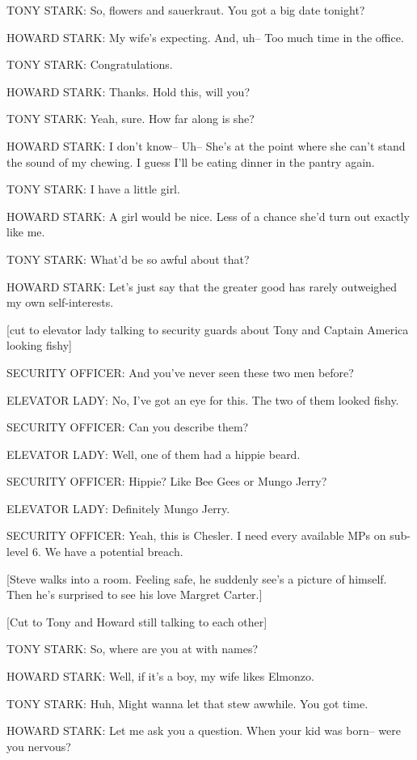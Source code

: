 TONY STARK: So, flowers and sauerkraut. You got a big date tonight?

HOWARD STARK: My wife's expecting. And, uh– Too much time in the office.

TONY STARK: Congratulations.

HOWARD STARK: Thanks. Hold this, will you?

TONY STARK: Yeah, sure. How far along is she?

HOWARD STARK: I don't know– Uh– She's at the point where she can't stand the sound of my chewing. I guess I'll be eating dinner in the pantry again.

TONY STARK: I have a little girl.

HOWARD STARK: A girl would be nice. Less of a chance she'd turn out exactly like me.

TONY STARK: What'd be so awful about that?

HOWARD STARK: Let's just say that the greater good has rarely outweighed my own self-interests.

[cut to elevator lady talking to security guards about Tony and Captain America looking fishy]

SECURITY OFFICER: And you've never seen these two men before?

ELEVATOR LADY: No, I've got an eye for this. The two of them looked fishy.

SECURITY OFFICER: Can you describe them?

ELEVATOR LADY: Well, one of them had a hippie beard.

SECURITY OFFICER: Hippie? Like Bee Gees or Mungo Jerry?

ELEVATOR LADY: Definitely Mungo Jerry.

SECURITY OFFICER: Yeah, this is Chesler. I need every available MPs on sub-level 6. We have a potential breach.

[Steve walks into a room. Feeling safe, he suddenly see's a picture of himself. Then he's surprised to see his love Margret Carter.]

[Cut to Tony and Howard still talking to each other]

TONY STARK: So, where are you at with names?

HOWARD STARK: Well, if it's a boy, my wife likes Elmonzo.

TONY STARK: Huh, Might wanna let that stew awwhile. You got time.

HOWARD STARK: Let me ask you a question. When your kid was born– were you nervous?

